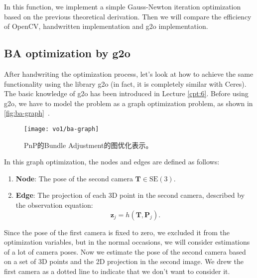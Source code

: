 In this function, we implement a simple Gauss-Newton iteration optimization based on the previous theoretical derivation. Then we will compare the efficiency of OpenCV, handwritten implementation and g2o implementation.

\subsection{BA optimization by g2o}
After handwriting the optimization process, let's look at how to achieve the same functionality using the library g2o (in fact, it is completely similar with Ceres). The basic knowledge of g2o has been introduced in Lecture \ref{cpt:6}. Before using g2o, we have to model the problem as a graph optimization problem, as shown in \autoref{fig:ba-graph}~.

\begin{figure}[!htp]
	\centering
	\texttt{[image: vo1/ba-graph]}
	\caption{PnP的Bundle Adjustment的图优化表示。}
	\label{fig:ba-graph}
\end{figure}

In this graph optimization, the nodes and edges are defined as follows:
\begin{enumerate}
	\item \textbf{Node}: The pose of the second camera $\mathbf{T} \in \mathrm{SE}(3)$.
	\item \textbf{Edge}: The projection of each 3D point in the second camera, described by the observation equation:
	\[
	\mathbf{z}_j = h(\mathbf{T}, \mathbf{P}_{j}).
	\]
\end{enumerate}

Since the pose of the first camera is fixed to zero, we excluded it from the optimization variables, but in the normal occasions, we will consider estimations of a lot of camera poses. Now we estimate the pose of the second camera based on a set of 3D points and the 2D projection in the second image. We drew the first camera as a dotted line to indicate that we don't want to consider it.

